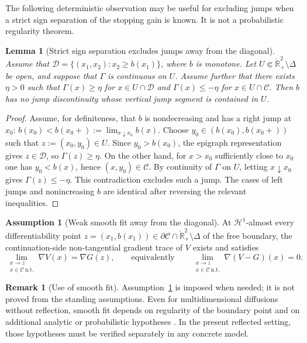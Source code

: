\documentclass[pdflatex,sn-mathphys-num]{sn-jnl}
\theoremstyle{plain}
\newtheorem{lemma}[theorem]{Lemma}
\theoremstyle{definition}
\newtheorem{assumption}[theorem]{Assumption}
\newtheorem{remark}[theorem]{Remark}
\newcommand{\R}{\mathbb{R}}
\newcommand{\interior}[1]{\mathring{#1}}
\begin{document}
The following deterministic observation may be useful for excluding jumps when
a strict sign separation of the stopping gain is known. It is not a
probabilistic regularity theorem.

\begin{lemma}[Strict sign separation excludes jumps away from the diagonal]
\label{lem:sign-separation-no-jumps}
Assume that $\mathcal D=\{(x_1,x_2):x_2\ge b(x_1)\}$, where $b$ is monotone.
Let $U\Subset \interior{\R}^2_+\setminus\Delta$ be open, and suppose that
$\Gamma$ is continuous on $U$. Assume further that there exists $\eta>0$ such
that $\Gamma(x)\ge\eta$ for $x\in U\cap\mathcal D$ and $\Gamma(x)\le-\eta$ for
$x\in U\cap\mathcal C$. Then $b$ has no jump discontinuity whose vertical jump
segment is contained in $U$.
\end{lemma}
\begin{proof}
Assume, for definiteness, that $b$ is nondecreasing and has a right jump at
$x_0$: $b(x_0)<b(x_0+):=\lim_{x\downarrow x_0}b(x)$. Choose
$y_0\in(b(x_0),b(x_0+))$ such that $z:=(x_0,y_0)\in U$. Since $y_0>b(x_0)$, the
epigraph representation gives $z\in\mathcal D$, so $\Gamma(z)\ge\eta$. On the
other hand, for $x>x_0$ sufficiently close to $x_0$ one has $y_0<b(x)$, hence
$(x,y_0)\in\mathcal C$. By continuity of $\Gamma$ on $U$, letting
$x\downarrow x_0$ gives $\Gamma(z)\le-\eta$. This contradiction excludes such a
jump. The cases of left jumps and nonincreasing $b$ are identical after
reversing the relevant inequalities.
\end{proof}

\begin{assumption}[Weak smooth fit away from the diagonal]
\label{ass:weak-smooth-fit}
At $\mathcal H^1$-almost every differentiability point
$z=(x_1,b(x_1))\in \partial\mathcal C\cap\interior{\R}^2_+\setminus\Delta$ of
the free boundary, the continuation-side non-tangential gradient trace of $V$
exists and satisfies
\[
   \lim_{\substack{x\to z\\x\in\mathcal C\ \mathrm{n.t.}}}
   \nabla V(x)
   =
   \nabla G(z),
   \qquad\text{equivalently}\qquad
   \lim_{\substack{x\to z\\x\in\mathcal C\ \mathrm{n.t.}}}
   \nabla(V-G)(x)=0.
\]
\end{assumption}

\begin{remark}[Use of smooth fit]
\label{rem:smooth-fit-status}
Assumption~\ref{ass:weak-smooth-fit} is imposed when needed; it is not proved
from the standing assumptions. Even for multidimensional diffusions without
reflection, smooth fit depends on regularity of the boundary point and on
additional analytic or probabilistic hypotheses
\cite{peskir2019continuity,de2020global,lamberton2013optimal}. In the present
reflected setting, those hypotheses must be verified separately in any concrete
model.
\end{remark}
\end{document}
